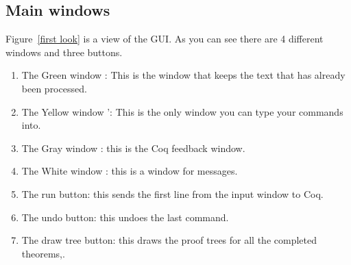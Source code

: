 \subsection{Main windows}
Figure~\ref{first look} is a view of the GUI. As you can see there are 4 different windows and three buttons.
\begin{enumerate}
\item The Green window  : This is the window that keeps the text that has already been processed.
\item The Yellow window ': This is the only window you can type your commands into.
\item The Gray  window : this is the Coq feedback window. 
\item The White window : this is a window for messages.
\item The run button: this sends the first line from the input window to Coq.
\item The undo button: this undoes the last command.
\item The draw tree button: this draws the proof trees for all the completed theorems,.
\end{enumerate}


